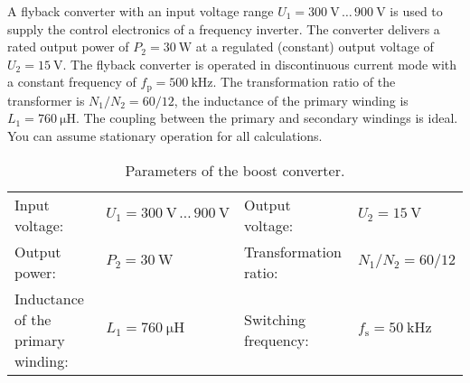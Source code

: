 

A flyback converter with an input voltage range $U_\mathrm{1} = \SI{300}{\volt} \, \dots \, \SI{900}{\volt}$ is used to supply the control electronics of a frequency inverter. The converter delivers a rated output power of  $P_\mathrm{2} = \SI{30}{\watt}$ at a regulated (constant) output voltage of  $U_\mathrm{2} = \SI{15}{\volt}$. The flyback converter is operated in discontinuous current mode with a constant frequency of  $f_\mathrm{p} = \SI{500}{\kilo\hertz}$. The transformation ratio of the transformer is $N_\mathrm{1}/N_\mathrm{2}=60/12$, the inductance of the primary winding is $L_\mathrm{1} = \SI{760}{\micro\henry}$. The coupling between the primary and secondary windings is ideal. You can assume stationary operation for all calculations.



\begin{table}[ht]
    \centering  %
    \begin{tabular}{llll}
        \toprule
        
        Input voltage: &  $U_{\mathrm{1}} = \SI{300}{\volt} \, \dots \, \SI{900}{\volt}$ & Output voltage: & $U_{\mathrm{2}} = \SI{15}{\volt}$ \\ 
        Output power: & $P_2 = \SI{30}{\watt}$  & Transformation ratio: & $N_\mathrm{1}/N_\mathrm{2}=60/12$ \\ 
        Inductance of the primary winding: & $L_\mathrm{1} = \SI{760}{\micro\henry}$ & Switching frequency: & $f_{\mathrm{s}} = \SI{50}{\kilo\hertz}$ \\ 
        \bottomrule
    \end{tabular}
    \caption{Parameters of the boost converter.}  %
    \label{table:ex04_Parameters of the circuit}
\end{table}



